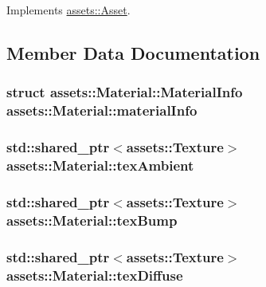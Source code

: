 Implements \hyperlink{classassets_1_1Asset_a43d029b59109ff2952206969d503c25f}{assets\-::\-Asset}.



\subsection{Member Data Documentation}
\hypertarget{classassets_1_1Material_aadf4a85a9c84a212bf70a66863c9ce25}{
\subsubsection[{material\-Info}]{\setlength{\rightskip}{0pt plus 5cm}struct {\bf assets\-::\-Material\-::\-Material\-Info}  assets\-::\-Material\-::material\-Info}}\label{classassets_1_1Material_aadf4a85a9c84a212bf70a66863c9ce25}
\hypertarget{classassets_1_1Material_a3519d812c3b52faa51e8ee105581a080}{
\subsubsection[{tex\-Ambient}]{\setlength{\rightskip}{0pt plus 5cm}std\-::shared\-\_\-ptr$<${\bf assets\-::\-Texture}$>$ assets\-::\-Material\-::tex\-Ambient}}\label{classassets_1_1Material_a3519d812c3b52faa51e8ee105581a080}
\hypertarget{classassets_1_1Material_ad8681142b15d5a60a519f7ca903d415b}{
\subsubsection[{tex\-Bump}]{\setlength{\rightskip}{0pt plus 5cm}std\-::shared\-\_\-ptr$<${\bf assets\-::\-Texture}$>$ assets\-::\-Material\-::tex\-Bump}}\label{classassets_1_1Material_ad8681142b15d5a60a519f7ca903d415b}
\hypertarget{classassets_1_1Material_ab415308f35aa92ba6cfeaf384a3e03eb}{
\subsubsection[{tex\-Diffuse}]{\setlength{\rightskip}{0pt plus 5cm}std\-::shared\-\_\-ptr$<${\bf assets\-::\-Texture}$>$ assets\-::\-Material\-::tex\-Diffuse}}\label{classassets_1_1Material_ab415308f35aa92ba6cfeaf384a3e03eb}
